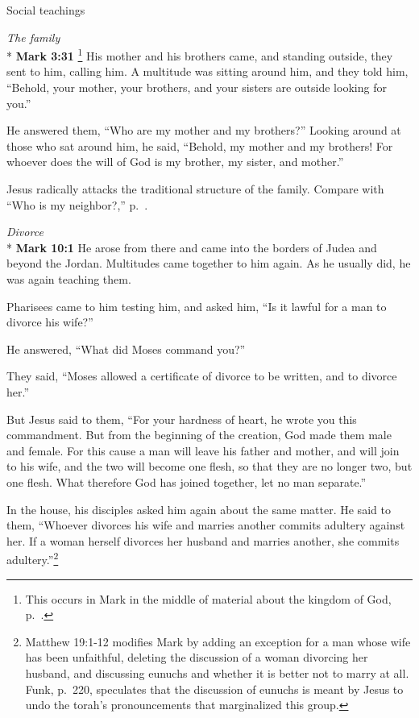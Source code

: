 \documentclass[10pt,a5paper,twoside]{article}
\newcommand{\quotesize}{\normalsize{}}
\newcommand{\comm}[1]{\begingroup \color{black!50} #1\endgroup}
\newenvironment{quotetext}{\begingroup\quotesize}{\endgroup}
\newcommand{\intex}[1]{\index[texts]{#1}}
\newcommand{\reftex}[1]{#1\intex{#1}}
\newcommand{\bible}[2]{\begin{quotetext}\textbf{#1}\intex{#1} #2\end{quotetext}}
\newcommand{\gospelmark}[2]{\bible{Mark #1}{#2}}
\newcommand{\subhead}[1]{\emph{#1}\\*}
\begin{document}
\begin{section}{Social teachings}

\subhead{The family}
\gospelmark{3:31}{\label{who-are-my-mother-and-my-brothers}\footnote{This occurs in Mark in the middle of material about the kingdom of God,
p.~\pageref{how-can-satan}.}
  His mother and his brothers came, and standing outside, they sent to him, calling him.   A multitude was sitting around him, and they told him, ``Behold, your mother, your brothers, and your sisters are outside looking for you.''

  He answered them, ``Who are my mother and my brothers?''   Looking around at those who sat around him, he said, ``Behold, my mother and my brothers!    For whoever does the will of God is my brother, my sister, and mother.''
}

\comm{
Jesus radically attacks the traditional structure of the family. Compare with ``Who is my neighbor?,'' p.~\pageref{good-samaritan}.
}

\subhead{Divorce}
\gospelmark{10:1}{
He arose from there and came into the borders of Judea and beyond the Jordan. Multitudes came together to him again. As he usually did, he was again teaching them.

  Pharisees came to him testing him, and asked him, ``Is it lawful for a man to divorce his wife?''

  He answered, ``What did Moses command you?''

  They said, ``Moses allowed a certificate of divorce to be written, and to divorce her.''

  But Jesus said to them, ``For your hardness of heart, he wrote you this commandment.    But from the beginning of the creation, God made them male and female.    For this cause a man will leave his father and mother, and will join to his wife,    and the two will become one flesh, so that they are no longer two, but one flesh.    What therefore God has joined together, let no man separate.''

  In the house, his disciples asked him again about the same matter.   He said to them, ``Whoever divorces his wife and marries another commits adultery against her.    If a woman herself divorces her husband and marries another, she commits adultery.''\footnote{\reftex{Matthew 19:1-12}
modifies Mark by adding an exception for a man whose wife has been unfaithful, deleting the discussion of a woman divorcing her
husband, and discussing eunuchs and whether it is better not to marry at all. Funk, p.~220, speculates that the discussion of eunuchs
is meant by Jesus to undo the torah's pronouncements that marginalized this group.}
}


\end{section}
\end{document}
